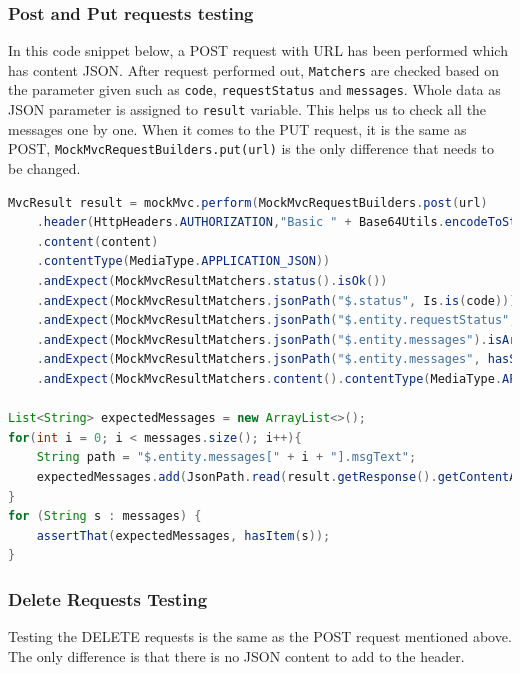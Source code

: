 \subsubsection{Post and Put requests testing}
In this code snippet below, a POST request with URL has been performed which has content JSON. After request performed out, \texttt{Matchers} are checked based on the parameter given such as \texttt{code}, \texttt{requestStatus} and \texttt{messages}. Whole data as JSON parameter is assigned to \texttt{result} variable. This helps us to check all the messages one by one. When it comes to the PUT request, it is the same as POST, \texttt{MockMvcRequestBuilders.put(url)} is the only difference that needs to be changed.
\begin{lstlisting}[language={JAVA}]
MvcResult result = mockMvc.perform(MockMvcRequestBuilders.post(url)
    .header(HttpHeaders.AUTHORIZATION,"Basic " + Base64Utils.encodeToString("admin:password".getBytes()))
    .content(content)
    .contentType(MediaType.APPLICATION_JSON))
    .andExpect(MockMvcResultMatchers.status().isOk())
    .andExpect(MockMvcResultMatchers.jsonPath("$.status", Is.is(code)))
    .andExpect(MockMvcResultMatchers.jsonPath("$.entity.requestStatus", Is.is(requestStatus)))
    .andExpect(MockMvcResultMatchers.jsonPath("$.entity.messages").isArray())
    .andExpect(MockMvcResultMatchers.jsonPath("$.entity.messages", hasSize(messages.size())))
    .andExpect(MockMvcResultMatchers.content().contentType(MediaType.APPLICATION_JSON)).andReturn();
        
List<String> expectedMessages = new ArrayList<>();
for(int i = 0; i < messages.size(); i++){
    String path = "$.entity.messages[" + i + "].msgText";
    expectedMessages.add(JsonPath.read(result.getResponse().getContentAsString(), path));
}
for (String s : messages) {
    assertThat(expectedMessages, hasItem(s));
}
\end{lstlisting}

\subsubsection{Delete Requests Testing}
Testing the DELETE requests is the same as the POST request mentioned above. The only difference is that there is no JSON content to add to the header.

